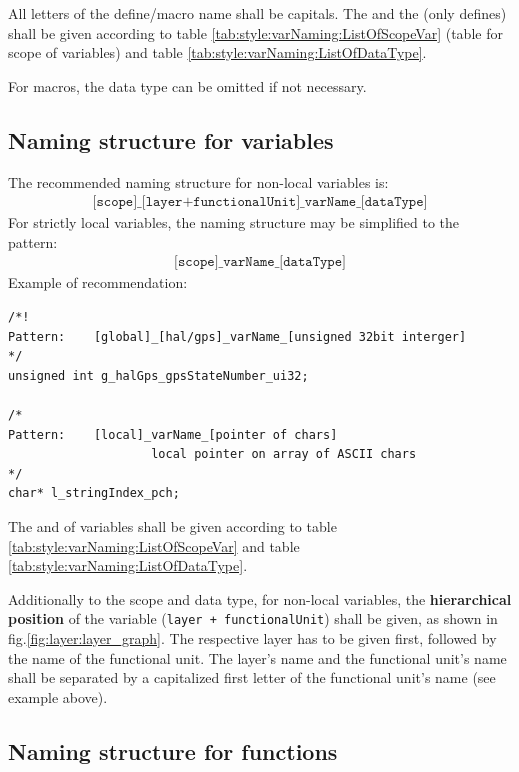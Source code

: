All letters of the define/macro name shall be capitals. The  and the  (only defines) shall be given according to table \ref{tab:style:varNaming:ListOfScopeVar} (table for scope of variables) and table \ref{tab:style:varNaming:ListOfDataType}.

For macros, the data type can be omitted if not necessary.

\subsection{Naming structure for variables}
\label{sec:style:varNaming:var}

The recommended naming structure for non-local variables is:
\begin{align}
\texttt{[scope]\_[layer+functionalUnit]\_varName\_[dataType]}
\label{eqn:style:namingStructure}
\end{align}
For strictly local variables, the naming structure may be simplified to the pattern:
\begin{align}
\texttt{[scope]\_varName\_[dataType]}
\label{eqn:style:namingStructure}
\end{align}
Example of recommendation:
\begin{lstlisting}
/*! 
Pattern: 	[global]_[hal/gps]_varName_[unsigned 32bit interger] 
*/
unsigned int g_halGps_gpsStateNumber_ui32;

/* 
Pattern: 	[local]_varName_[pointer of chars] 
					local pointer on array of ASCII chars
*/
char* l_stringIndex_pch;
\end{lstlisting}

The  and  of variables shall be given according to table \ref{tab:style:varNaming:ListOfScopeVar} and table \ref{tab:style:varNaming:ListOfDataType}. 

Additionally to the scope and data type, for non-local variables,  the \textbf{hierarchical position} of the variable (\texttt{layer + functionalUnit}) shall be given, as shown in fig.\ref{fig:layer:layer_graph}. The respective layer has to be given first, followed by the name of the functional unit. The layer's name and the functional unit's name shall be separated by a capitalized first letter of the functional unit's name (see example above).

\subsection{Naming structure for functions}
\label{sec:style:varNaming:func}

